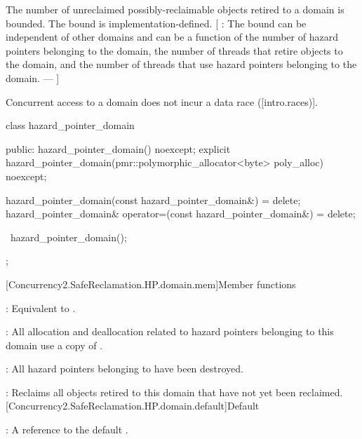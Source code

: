 \pnum
The number of unreclaimed possibly-reclaimable objects retired to a domain is bounded.
The bound is implementation-defined. [ : The bound can be independent of other
domains and can be a function of the number of hazard pointers belonging to the
domain, the number of threads that retire objects to the domain, and the number of
threads that use hazard pointers belonging to the domain. ---  ]

\pnum
Concurrent access to a domain does not incur a data race ([intro.races)].

\begin{codeblock}
class hazard_pointer_domain {
public:
  hazard_pointer_domain() noexcept;
  explicit hazard_pointer_domain(pmr::polymorphic_allocator<byte> poly_alloc) noexcept;

  hazard_pointer_domain(const hazard_pointer_domain&) = delete;
  hazard_pointer_domain& operator=(const hazard_pointer_domain&) = delete;

  ~hazard_pointer_domain();
};
\end{codeblock}

[Concurrency2.SafeReclamation.HP.domain.mem]{Member functions}


\pnum
{}: Equivalent to .
\\


\pnum
{}: All allocation and deallocation related to hazard pointers belonging to this
domain use a copy of .
\\


\pnum
{}: All hazard pointers belonging to  have been destroyed.

\pnum
{}: Reclaims all objects retired to this domain that have not yet been reclaimed.
\\

[Concurrency2.SafeReclamation.HP.domain.default]{Default }


\pnum
{}: A reference to the default .

